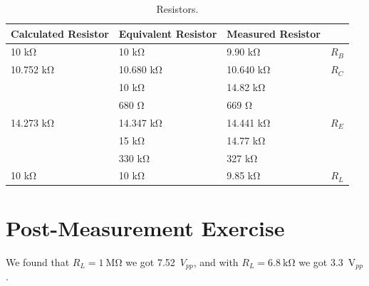 \documentclass{../../ece-report}
\begin{document}
\begin{table}[h!]
  \centering
  \begin{tabular}{l l l c}\toprule
    \textbf{Calculated Resistor} & \textbf{Equivalent Resistor} & \textbf{Measured Resistor} & \\
    \midrule

        10 \si{\kohm} & 10 \si{\kohm} & 9.90 \si{\kohm} & $R_B$ \\
          \midrule
        10.752 \si{\kohm}    & 10.680 \si{\kohm}    & 10.640 \si{\kohm}    & $R_C$ \\
          & 10 \si{\kohm}    & 14.82   \si{\kohm}  &       \\
          & 680 \si{\ohm}    & 669   \si{\ohm}  &       \\
          \midrule
          14.273 \si{\kohm}     & 14.347 \si{\kohm}     & 14.441 \si{\kohm}  & $R_E$ \\
                                & 15 \si{\kohm}   &  14.77 \si{\kohm}   &       \\
          & 330 \si{\kohm}     & 327 \si{\kohm}   &       \\
\midrule
10 \si{\kohm}     & 10 \si{\kohm}     & 9.85 \si{\kohm}  & $R_L$ \\
\bottomrule
\end{tabular}
\caption{Resistors.}
\label{tab:active_resistors}
\end{table}



\section*{Post-Measurement Exercise}

We found that $R_L = 1~\si{\Mohm}$ we got 7.52~$V_{pp}$, and with $R_L = 6.8~\si{\kohm}$ we got 3.3~V$_{pp}$.
\end{document}
